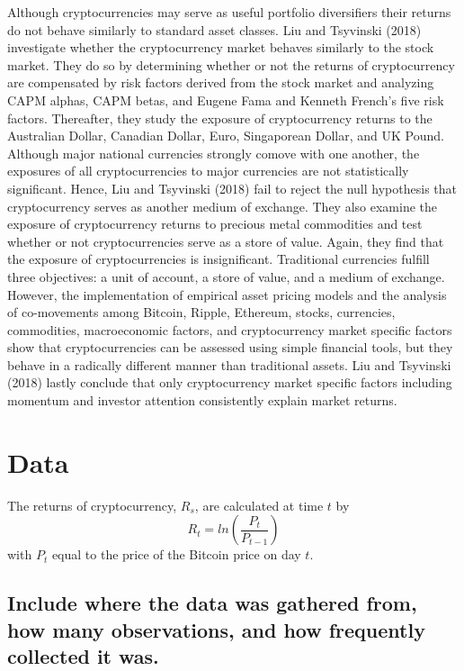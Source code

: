 \documentclass[]{article}
\begin{document}
Although cryptocurrencies may serve as useful portfolio diversifiers
their returns do not behave similarly to standard asset classes. Liu and
Tsyvinski (2018) investigate whether the cryptocurrency market behaves
similarly to the stock market. They do so by determining whether or not
the returns of cryptocurrency are compensated by risk factors derived
from the stock market and analyzing CAPM alphas, CAPM betas, and Eugene
Fama and Kenneth French's five risk factors. Thereafter, they study the
exposure of cryptocurrency returns to the Australian Dollar, Canadian
Dollar, Euro, Singaporean Dollar, and UK Pound. Although major national
currencies strongly comove with one another, the exposures of all
cryptocurrencies to major currencies are not statistically significant.
Hence, Liu and Tsyvinski (2018) fail to reject the null hypothesis that
cryptocurrency serves as another medium of exchange. They also examine
the exposure of cryptocurrency returns to precious metal commodities and
test whether or not cryptocurrencies serve as a store of value. Again,
they find that the exposure of cryptocurrencies is insignificant.
Traditional currencies fulfill three objectives: a unit of account, a
store of value, and a medium of exchange. However, the implementation of
empirical asset pricing models and the analysis of co-movements among
Bitcoin, Ripple, Ethereum, stocks, currencies, commodities,
macroeconomic factors, and cryptocurrency market specific factors show
that cryptocurrencies can be assessed using simple financial tools, but
they behave in a radically different manner than traditional assets. Liu
and Tsyvinski (2018) lastly conclude that only cryptocurrency market
specific factors including momentum and investor attention consistently
explain market returns.

\section{Data}\label{data}

The returns of cryptocurrency, \(R_s\), are calculated at time \(t\) by
\[R_{t} = ln(\frac{P_t}{P_{t-1}})\] with \(P_t\) equal to the price of
the Bitcoin price on day \(t\).

\subsection{Include where the data was gathered from, how many
observations, and how frequently collected it
was.}\label{include-where-the-data-was-gathered-from-how-many-observations-and-how-frequently-collected-it-was.}
\end{document}

